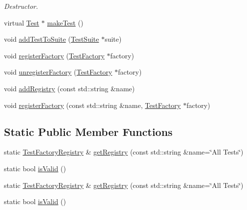 \begin{DoxyCompactItemize}
\begin{DoxyCompactList}\small\item\em Destructor. \end{DoxyCompactList}\item 
virtual \hyperlink{class_test}{Test} $\ast$ \hyperlink{class_test_factory_registry_a75fd01e6d565fb0f576ed1a887655089}{make\+Test} ()
\item 
void \hyperlink{class_test_factory_registry_a39180636ddd11a499d15614a335b17d5}{add\+Test\+To\+Suite} (\hyperlink{class_test_suite}{Test\+Suite} $\ast$suite)
\item 
void \hyperlink{class_test_factory_registry_a632c38375727ca735e2c1897bd625b99}{register\+Factory} (\hyperlink{class_test_factory}{Test\+Factory} $\ast$factory)
\item 
void \hyperlink{class_test_factory_registry_afa3fb925b07eb34e9ccfab84812afc18}{unregister\+Factory} (\hyperlink{class_test_factory}{Test\+Factory} $\ast$factory)
\item 
void \hyperlink{class_test_factory_registry_abb68b347450c97ff0dfc9ea3dfe03f4c}{add\+Registry} (const std\+::string \&name)
\item 
void \hyperlink{class_test_factory_registry_aff8d8215ec83fbb77d46706264e2f161}{register\+Factory} (const std\+::string \&name, \hyperlink{class_test_factory}{Test\+Factory} $\ast$factory)
\end{DoxyCompactItemize}
\subsection*{Static Public Member Functions}
\begin{DoxyCompactItemize}
\item 
static \hyperlink{class_test_factory_registry}{Test\+Factory\+Registry} \& \hyperlink{class_test_factory_registry_ac153260dae65c3e6e8ebc33ecde04ccb}{get\+Registry} (const std\+::string \&name=\char`\"{}All Tests\char`\"{})
\item 
static bool \hyperlink{class_test_factory_registry_a53d3eb5bee2b1812b8af98cc12ee9c8c}{is\+Valid} ()
\item 
static \hyperlink{class_test_factory_registry}{Test\+Factory\+Registry} \& \hyperlink{class_test_factory_registry_a1331b28bb1a8bc3db6b8e5ec994ef4ab}{get\+Registry} (const std\+::string \&name=\char`\"{}All Tests\char`\"{})
\item 
static bool \hyperlink{class_test_factory_registry_a8638d92944309341c68089aa098800cb}{is\+Valid} ()
\end{DoxyCompactItemize}


